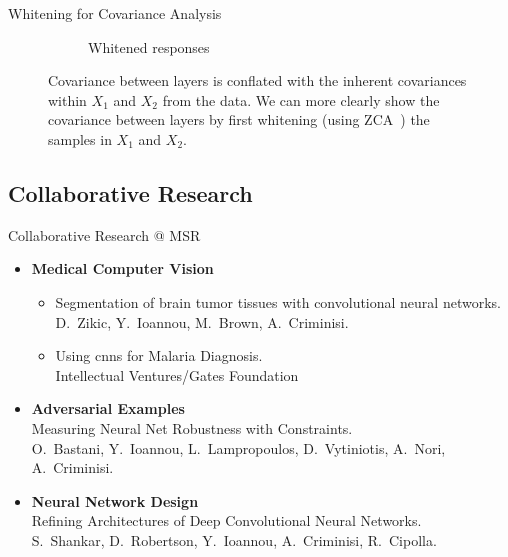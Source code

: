 \documentclass[t,xcolor=dvipsnames]{beamer}
\begin{document}
\begin{frame}{Whitening for Covariance Analysis}
\begin{figure}[tbp]
\begin{subfigure}[b]{0.45\linewidth}
    \caption{Whitened responses}
    \label{fig:whitened}
\end{subfigure}
\caption{Covariance between layers is conflated with the inherent covariances within $X_1$ and $X_2$ from the data. We can more clearly show the covariance between layers by first whitening (using ZCA~\citep{CIFAR10}) the samples in $X_1$ and $X_2$.}
\label{fig:whitevsnot}
\end{figure}
\end{frame}


\subsection{Collaborative Research}
\begin{frame}{Collaborative Research @ MSR}
\begin{itemize}
    \item \textbf{Medical Computer Vision}
    \begin{itemize}
        \item Segmentation of brain tumor tissues with convolutional neural networks.\\{\footnotesize D.\ Zikic, Y.\ Ioannou, M.\ Brown, A.\ Criminisi.}\\%
        \item Using \glspl{cnn} for Malaria Diagnosis.\\{\footnotesize Intellectual Ventures/Gates Foundation}
    \end{itemize}
    \item \textbf{Adversarial Examples}\\Measuring Neural Net Robustness with Constraints.\\{\footnotesize O.\ Bastani, Y.\ Ioannou, L.\ Lampropoulos, D.\ Vytiniotis, A.\ Nori, A.\ Criminisi.}%
    \item \textbf{Neural Network Design}\\Refining Architectures of Deep Convolutional Neural Networks.\\{\footnotesize 
S.\ Shankar, D.\ Robertson, Y.\ Ioannou, A.\ Criminisi, R.\ Cipolla.}%
\end{itemize}
\end{frame}
\end{document}
